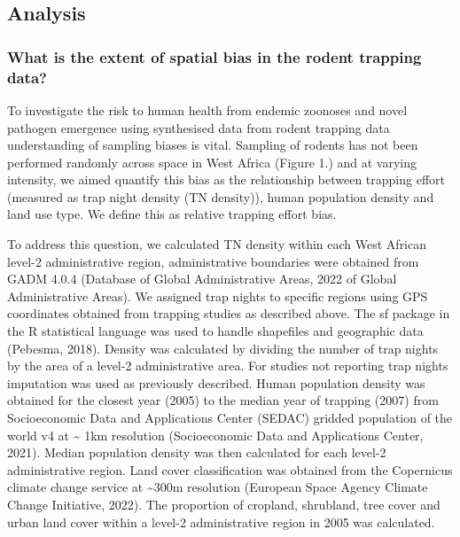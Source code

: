 \documentclass[
]{article}
\begin{document}
\hypertarget{analysis}{%
\subsection{Analysis}\label{analysis}}

\hypertarget{what-is-the-extent-of-spatial-bias-in-the-rodent-trapping-data}{%
\subsubsection{What is the extent of spatial bias in the rodent trapping
data?}\label{what-is-the-extent-of-spatial-bias-in-the-rodent-trapping-data}}

To investigate the risk to human health from endemic zoonoses and novel
pathogen emergence using synthesised data from rodent trapping data
understanding of sampling biases is vital. Sampling of rodents has not
been performed randomly across space in West Africa (Figure 1.) and at
varying intensity, we aimed quantify this bias as the relationship
between trapping effort (measured as trap night density (TN density)),
human population density and land use type. We define this as relative
trapping effort bias.

To address this question, we calculated TN density within each West
African level-2 administrative region, administrative boundaries were
obtained from GADM 4.0.4 (Database of Global Administrative Areas, 2022
of Global Administrative Areas). We assigned trap nights to specific
regions using GPS coordinates obtained from trapping studies as
described above. The sf package in the R statistical language was used
to handle shapefiles and geographic data (Pebesma, 2018). Density was
calculated by dividing the number of trap nights by the area of a
level-2 administrative area. For studies not reporting trap nights
imputation was used as previously described. Human population density
was obtained for the closest year (2005) to the median year of trapping
(2007) from Socioeconomic Data and Applications Center (SEDAC) gridded
population of the world v4 at \textasciitilde{} 1km resolution
(Socioeconomic Data and Applications Center, 2021). Median population
density was then calculated for each level-2 administrative region. Land
cover classification was obtained from the Copernicus climate change
service at \textasciitilde300m resolution (European Space Agency Climate
Change Initiative, 2022). The proportion of cropland, shrubland, tree
cover and urban land cover within a level-2 administrative region in
2005 was calculated.
\end{document}
